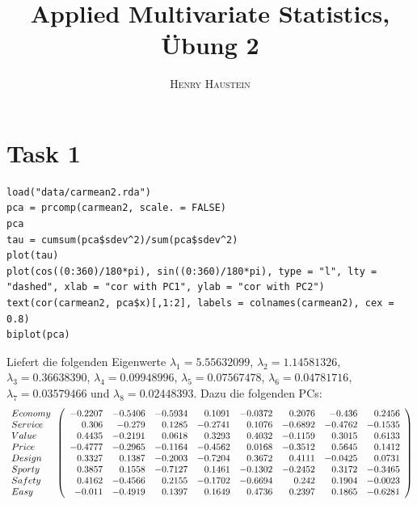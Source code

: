 \documentclass{article}
\title{\textbf{Applied Multivariate Statistics, Übung 2}}
\author{\textsc{Henry Haustein}}
\date{}
\begin{document}
	\maketitle
	
	\section*{Task 1}
	\begin{lstlisting}
load("data/carmean2.rda")
pca = prcomp(carmean2, scale. = FALSE)
pca
tau = cumsum(pca$sdev^2)/sum(pca$sdev^2)
plot(tau)
plot(cos((0:360)/180*pi), sin((0:360)/180*pi), type = "l", lty = "dashed", xlab = "cor with PC1", ylab = "cor with PC2")
text(cor(carmean2, pca$x)[,1:2], labels = colnames(carmean2), cex = 0.8)
biplot(pca)
	\end{lstlisting}
	Liefert die folgenden Eigenwerte $\lambda_1 = 5.55632099$, $\lambda_2 = 1.14581326$, $\lambda_3 = 0.36638390$, $\lambda_4 = 0.09948996$, $\lambda_5 = 0.07567478$, $\lambda_6 = 0.04781716$, $\lambda_7 = 0.03579466$ und $\lambda_8 = 0.02448393$. Dazu die folgenden PCs:
	\begin{align}
		\begin{array}{l}
			Economy \\
			Service \\
			Value \\
			Price \\
			Design \\
			Sporty \\
			Safety \\
			Easy
		\end{array}
		\left(\begin{array}{rrrrrrrr}
			-0.2207 & -0.5406 & -0.5934 & 0.1091 & -0.0372 & 0.2076 & -0.436 & 0.2456 \\ 0.306 & -0.279 & 0.1285 & -0.2741 & 0.1076 & -0.6892 & -0.4762 & -0.1535 \\ 0.4435 & -0.2191 & 0.0618 & 0.3293 & 0.4032 & -0.1159 & 0.3015 & 0.6133 \\ -0.4777 & -0.2965 & -0.1164 & -0.4562 & 0.0168 & -0.3512 & 0.5645 & 0.1412 \\ 0.3327 & 0.1387 & -0.2003 & -0.7204 & 0.3672 & 0.4111 & -0.0425 & 0.0731 \\ 0.3857 & 0.1558 & -0.7127 & 0.1461 & -0.1302 & -0.2452 & 0.3172 & -0.3465 \\ 0.4162 & -0.4566 & 0.2155 & -0.1702 & -0.6694 & 0.242 & 0.1904 & -0.0023 \\ -0.011 & -0.4919 & 0.1397 & 0.1649 & 0.4736 & 0.2397 & 0.1865 & -0.6281
		\end{array}\right) \notag
	\end{align}
\end{document}
